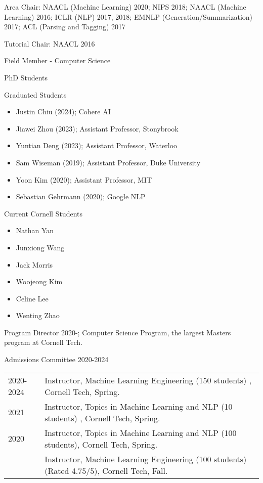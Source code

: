 \documentclass[10pt]{article}
\begin{document}
{\ind Area Chair:
\ind NAACL (Machine Learning) 2020; NIPS 2018; NAACL (Machine Learning) 2016; ICLR (NLP) 2017, 2018; EMNLP (Generation/Summarization) 2017; ACL (Parsing and Tagging) 2017

\ind Tutorial Chair: NAACL 2016

\bigskip

\medskip

\ind Field Member - Computer Science

\ind PhD Students


\ind Graduated Students

\begin{itemize}
	\item Justin Chiu (2024); Cohere AI
	\item Jiawei Zhou (2023); Assistant Professor, Stonybrook
	\item Yuntian Deng (2023); Assistant Professor, Waterloo
	\item Sam Wiseman (2019); Assistant Professor, Duke University
	\item Yoon Kim (2020); Assistant Professor, MIT
	\item Sebastian Gehrmann (2020); Google NLP
\end{itemize}


\ind Current Cornell Students

\begin{itemize}
	\item Nathan Yan
	\item Junxiong Wang
	\item Jack Morris
	\item Woojeong Kim
	\item Celine Lee
	\item Wenting Zhao
\end{itemize}


\medskip

\ind Program Director 2020-; Computer Science Program, the largest Masters program at Cornell Tech.

\ind Admissions Committee 2020-2024
\bigskip



\hspace{-1cm} \begin{tabular}{lp{11.5cm}}
	2020-2024 & \ind  Instructor, Machine Learning Engineering (150 students) , Cornell Tech, Spring.                                                                       \\
	2021      & \ind  Instructor, Topics in Machine Learning and NLP (10 students) , Cornell Tech, Spring.                                                                  \\
	2020      & \ind  Instructor, Topics in Machine Learning and NLP (100 students), Cornell Tech, Spring.                                                                  \\
	          & \ind  Instructor,  Machine Learning Engineering (100 students) (Rated 4.75/5), Cornell Tech, Fall.                                                          \\


\end{tabular}}
\end{document}

